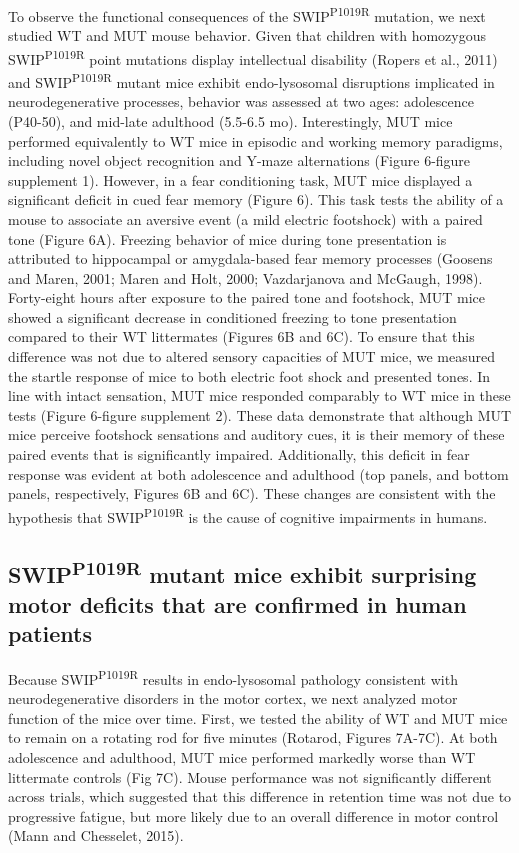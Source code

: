 To observe the functional consequences of the SWIP\textsuperscript{P1019R} mutation, we next
studied WT and MUT mouse behavior. Given that children with homozygous
SWIP\textsuperscript{P1019R} point mutations display intellectual disability (Ropers et al., 2011)
and SWIP\textsuperscript{P1019R} mutant mice exhibit endo-lysosomal disruptions implicated in
neurodegenerative processes, behavior was assessed at two ages: adolescence
(P40-50), and mid-late adulthood (5.5-6.5 mo). Interestingly, MUT mice performed
equivalently to WT mice in episodic and working memory paradigms, including
novel object recognition and Y-maze alternations (Figure 6-figure supplement 1).
However, in a fear conditioning task, MUT mice displayed a significant deficit
in cued fear memory (Figure 6). This task tests the ability of a mouse to
associate an aversive event (a mild electric footshock) with a paired tone
(Figure 6A). Freezing behavior of mice during tone presentation is attributed to
hippocampal or amygdala-based fear memory processes (Goosens and Maren, 2001;
Maren and Holt, 2000; Vazdarjanova and McGaugh, 1998). Forty-eight hours after
exposure to the paired tone and footshock, MUT mice showed a significant
decrease in conditioned freezing to tone presentation compared to their WT
littermates (Figures 6B and 6C). To ensure that this difference was not due to
altered sensory capacities of MUT mice, we measured the startle response of mice
to both electric foot shock and presented tones. In line with intact sensation,
MUT mice responded comparably to WT mice in these tests (Figure 6-figure
supplement 2). These data demonstrate that although MUT mice perceive footshock
sensations and auditory cues, it is their memory of these paired events that is
significantly impaired. Additionally, this deficit in fear response was evident
at both adolescence and adulthood (top panels, and bottom panels, respectively,
Figures 6B and 6C). These changes are consistent with the hypothesis that
SWIP\textsuperscript{P1019R} is the cause of cognitive impairments in humans. 

\subsection{SWIP\textsuperscript{P1019R} mutant mice exhibit surprising motor 
deficits that are confirmed in human patients}

Because SWIP\textsuperscript{P1019R} results in endo-lysosomal pathology
consistent with neurodegenerative disorders in the motor cortex, we next
analyzed motor function of the mice over time. First, we tested the ability of
WT and MUT mice to remain on a rotating rod for five minutes (Rotarod, Figures
7A-7C). At both adolescence and adulthood, MUT mice performed markedly worse
than WT littermate controls (Fig 7C). Mouse performance was not significantly
different across trials, which suggested that this difference in retention time
was not due to progressive fatigue, but more likely due to an overall difference
in motor control (Mann and Chesselet, 2015).

